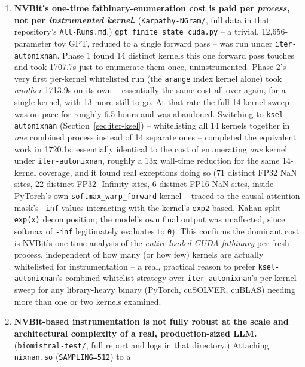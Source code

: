 \documentclass[11pt]{article}
\begin{document}
\begin{enumerate}
  none of which affect \texttt{autonixnan}'s parsed output but which do
  make the raw log file unwieldy to read by hand.
\item \textbf{NVBit's one-time fatbinary-enumeration cost is paid per
  \emph{process}, not per \emph{instrumented kernel}.}
  (\texttt{Karpathy-NGram/}, full data in that repository's
  \texttt{All-Runs.md}.) \texttt{gpt\_finite\_\allowbreak state\_cuda.py} -- a trivial,
  12{,}656-parameter toy GPT, reduced to a single forward pass -- was run
  under \texttt{iter-autonixnan}. Phase 1 found 14 distinct kernels this
  one forward pass touches and took 1707.7s just to enumerate them once,
  uninstrumented. Phase 2's very first per-kernel whitelisted run (the
  \texttt{arange} index kernel alone) took \emph{another} 1713.9s on its
  own -- essentially the same cost all over again, for a single kernel,
  with 13 more still to go. At that rate the full 14-kernel sweep was on
  pace for roughly 6.5 hours and was abandoned. Switching to
  \texttt{ksel-autonixnan} (Section~\ref{sec:iter-ksel}) -- whitelisting
  all 14 kernels together in \emph{one} combined process instead of 14
  separate ones -- completed the equivalent work in 1720.1s: essentially
  identical to the cost of enumerating \emph{one} kernel under
  \texttt{iter-autonixnan}, roughly a 13x wall-time reduction for the
  same 14-kernel coverage, and it found real exceptions doing so (71
  distinct FP32 NaN sites, 22 distinct FP32 -Infinity sites, 6 distinct
  FP16 NaN sites, inside PyTorch's own
  \texttt{softmax\_warp\_\allowbreak forward} kernel -- traced to the
  causal attention mask's \texttt{-inf} values
  interacting with the kernel's \texttt{exp2}-based, Kahan-split
  \texttt{exp(x)} decomposition; the model's own final output was
  unaffected, since softmax of \texttt{-inf} legitimately evaluates to
  \texttt{0}). This confirms the dominant cost is NVBit's one-time
  analysis of the \emph{entire loaded CUDA fatbinary} per fresh process,
  independent of how many (or how few) kernels are actually whitelisted
  for instrumentation -- a real, practical reason to prefer
  \texttt{ksel-autonixnan}'s combined-whitelist strategy over
  \texttt{iter-autonixnan}'s per-kernel sweep for any library-heavy
  binary (PyTorch, cuSOLVER, cuBLAS) needing more than one or two
  kernels examined.
\item \textbf{NVBit-based instrumentation is not fully robust at the
  scale and architectural complexity of a real, production-sized LLM.}
  (\texttt{biomistral-test/}, full report and logs in that directory.)
  Attaching \texttt{nixnan.so} (\texttt{SAMPLING=512}) to a

\end{enumerate}
\end{document}
